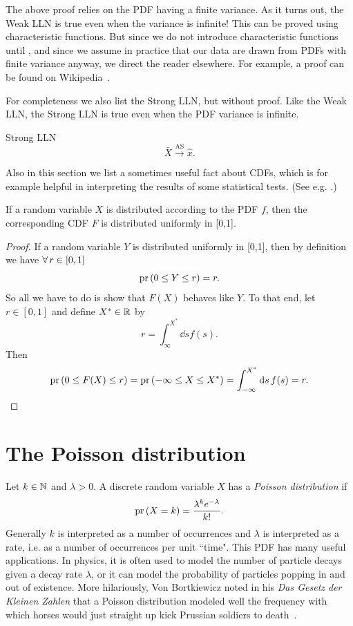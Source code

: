 The above proof relies on the PDF having a finite
variance. As it turns out, the Weak LLN is true
even when the variance is infinite! This can be proved
using characteristic functions. But since we do not introduce characteristic
functions until , and since we assume in practice
that our data are drawn from PDFs with finite variance anyway,
we direct the reader elsewhere. For example, a proof can be
found on Wikipedia~\cite{Wiki_LLN}.

For completeness we also list the Strong LLN, but without proof. 
Like the Weak LLN, the Strong LLN is true even when the PDF variance
is infinite.

\begin{theorem}{Strong LLN}{}
  $$
    \bar{X}\xrightarrow{\text{AS}}\hat{x}.
  $$
\end{theorem}

Also in this section we list a sometimes useful fact about CDFs, which is
for example helpful in interpreting the results of some statistical
tests. (See e.g. .) 

\begin{proposition}{}{}
  If a random variable $X$ is distributed according to the PDF $f$, then
  the corresponding CDF $F$ is distributed uniformly in [0,1].
  \begin{proof}
    If a random variable $Y$ is distributed uniformly in [0,1], then
    by definition we have $\operatorname{\forall} r\in [0,1]$
    $$
      \operatorname{pr}\left(0\leq Y\leq r\right)=r.
    $$
    So all we have to do is show that $F(X)$ behaves like $Y$. To that end,
    let $r\in[0,1]$ and define $X^*\in\mathbb{R}$ by
    $$
      r=\int_\infty^{X^*}\dd{s}f(s).
    $$
    Then
    $$
      \operatorname{pr}\left(0\leq F(X)\leq r\right)
      =\operatorname{pr}\left(-\infty\leq X\leq X^*\right)
      =\int_{-\infty}^{X^*}\dd{s}f(s)
      =r.
    $$
  \end{proof}
\end{proposition}


\section{The Poisson distribution}\label{sec:Poisson}

Let $k\in\mathbb{N}$ and $\lambda>0$. A discrete random variable $X$ has 
a {\it Poisson distribution} if
\begin{equation}\label{eq:poisson}
\operatorname{pr}\left(X=k\right)=\frac{\lambda^k e^{-\lambda}}{k!}.
\end{equation}
Generally $k$ is interpreted as a number of occurrences and $\lambda$ is
interpreted as a rate, i.e. as a number of occurrences per unit ``time".
This PDF has many useful applications. In physics, it is often used to model 
the number of particle decays given a decay rate $\lambda$, or it can
model the probability of particles popping in and out of existence. More hilariously, 
Von Bortkiewicz noted in his {\it Das Gesetz der Kleinen Zahlen} that a Poisson
distribution modeled well the frequency with which horses would just straight 
up kick Prussian soldiers to death~\cite{funnyPrussianMan}.

